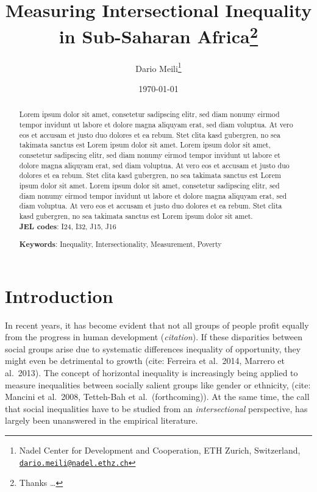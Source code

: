 \documentclass[
  11pt,
a4paper
]{article}
\title{Measuring Intersectional Inequality in Sub-Saharan Africa\thanks{Thanks \ldots{}}}
\author{Dario Meili\footnote{Nadel Center for Development and Cooperation, ETH Zurich, Switzerland, \href{mailto:dario.meili@nadel.ethz.ch}{\nolinkurl{dario.meili@nadel.ethz.ch}}}}
\date{\today}
\begin{document}
\maketitle
\thispagestyle{empty} %
\begin{abstract}
  \noindent Lorem ipsum dolor sit amet, consetetur sadipscing elitr, sed diam nonumy eirmod tempor invidunt ut labore et dolore magna aliquyam erat, sed diam voluptua. At vero eos et accusam et justo duo dolores et ea rebum. Stet clita kasd gubergren, no sea takimata sanctus est Lorem ipsum dolor sit amet. Lorem ipsum dolor sit amet, consetetur sadipscing elitr, sed diam nonumy eirmod tempor invidunt ut labore et dolore magna aliquyam erat, sed diam voluptua. At vero eos et accusam et justo duo dolores et ea rebum. Stet clita kasd gubergren, no sea takimata sanctus est Lorem ipsum dolor sit amet. Lorem ipsum dolor sit amet, consetetur sadipscing elitr, sed diam nonumy eirmod tempor invidunt ut labore et dolore magna aliquyam erat, sed diam voluptua. At vero eos et accusam et justo duo dolores et ea rebum. Stet clita kasd gubergren, no sea takimata sanctus est Lorem ipsum dolor sit amet.\\
  
  \noindent \textbf{JEL codes}: I24, I32, J15, J16
    
  \noindent \textbf{Keywords}: Inequality, Intersectionality, Measurement, Poverty
  \end{abstract}
\restoregeometry

\hypertarget{introduction}{%
\section{Introduction}\label{introduction}}

In recent years, it has become evident that not all groups of people profit equally from the progress in human development (\emph{citation}). If these disparities between social groups arise due to systematic differences inequality of opportunity, they might even be detrimental to growth (cite: Ferreira et al.~2014, Marrero et al.~2013). The concept of horizontal inequality is increasingly being applied to measure inequalities between socially salient groups like gender or ethnicity, (cite: Mancini et al.~2008, Tetteh-Bah et al.~(forthcoming)). At the same time, the call that social inequalities have to be studied from an \emph{intersectional} perspective, has largely been unanswered in the empirical literature.
\end{document}

